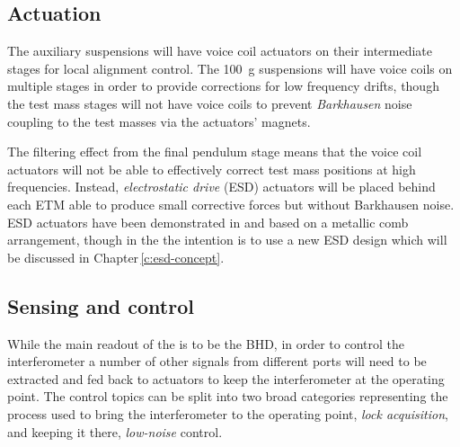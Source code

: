 \subsection{\label{sec:ssm-actuation}Actuation}
The auxiliary suspensions will have voice coil actuators on their intermediate stages for local alignment control. The \SI{100}{\gram} suspensions will have voice coils on multiple stages in order to provide corrections for low frequency drifts, though the test mass stages will not have voice coils to prevent \emph{Barkhausen} noise \cite{Weiss2008} coupling to the test masses via the actuators' magnets.

The filtering effect from the final pendulum stage means that the voice coil actuators will not be able to effectively correct test mass positions at high frequencies. Instead, \emph{electrostatic drive} (\gls{ESD}) actuators will be placed behind each \gls{ETM} able to produce small corrective forces but without Barkhausen noise. \gls{ESD} actuators have been demonstrated in \GEO{} \cite{Hewitson2007} and \ALIGO{} \cite{Aston2012} based on a metallic comb arrangement, though in the \SSMEXPT{} the intention is to use a new \gls{ESD} design which will be discussed in Chapter\,\ref{c:esd-concept}.

\subsection{\label{sec:ssm-sensing-and-control}Sensing and control}
While the main readout of the \SSMEXPT{} is to be the \gls{BHD}, in order to control the interferometer a number of other signals from different ports will need to be extracted and fed back to actuators to keep the interferometer at the operating point. The control topics can be split into two broad categories representing the process used to bring the interferometer to the operating point, \emph{lock acquisition}, and keeping it there, \emph{low-noise} control.

